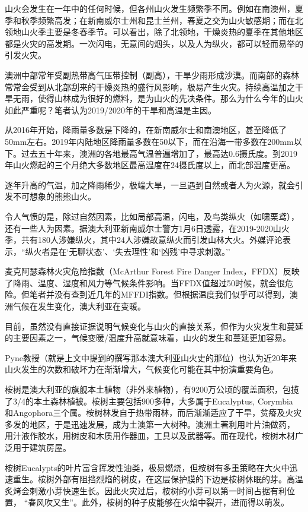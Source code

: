 \documentclass[
]{book}
\begin{document}
山火会发生在一年中的任何时候，但各州山火发生频繁季不同。例如在南澳州，夏季和秋季频繁高发；在新南威尔士州和昆士兰州，春夏之交为山火敏感期；而在北领地山火季主要是冬春季节。可以看出，除了北领地，干燥炎热的夏季在其他地区都是火灾的高发期。一次闪电，无意间的烟头，以及人为纵火，都可以轻而易举的引发火灾。

澳洲中部常年受副热带高气压带控制（副高），干旱少雨形成沙漠。而南部的森林常常会受到从北部刮来的干燥炎热的盛行风影响，极易产生火灾。持续高温加之干旱无雨，使得山林成为很好的燃料，是为山火的先决条件。那么为什么今年的山火如此严重呢？笔者认为2019/2020年的干旱和高温是主因。

从2016年开始，降雨量多数是下降的，在新南威尔士和南澳地区，甚至降低了50mm左右。2019年内陆地区降雨量多数在50以下，而在沿海一带多数在200mm以下。过去五十年来，澳洲的各地最高气温普遍增加了，最高达0.6摄氏度。到2019年山火燃起的三个月绝大多数地区最高温度在24摄氏度以上，而北部温度更高。

逐年升高的气温，加之降雨稀少，极端大旱，一旦遇到自然或者人为火源，就会引发不可想象的熊熊山火。

令人气愤的是，除过自然因素，比如局部高温，闪电，及鸟类纵火（如啸栗鸢），还有一些人为因素。据澳大利亚新南威尔士警方1月6日透露，在2019-2020山火季，共有180人涉嫌纵火，其中24人涉嫌故意纵火而引发山林大火。外媒评论表示，``纵火者是在`无聊状态'、`失去理性'和`凶残'中寻求刺激。''

麦克阿瑟森林火灾危险指数（McArthur Forest Fire Danger Index，FFDX）反映了降雨、温度、湿度和风力等气候条件影响。当FFDX值超过50时候，就会很危险。但笔者并没有查到近几年的MFFDI指数。但根据温度我们似乎可以得到，澳洲气候在发生变化，澳大利亚在变暖。

目前，虽然没有直接证据说明气候变化与山火的直接关系，但作为火灾发生和蔓延的主要因素之一，气候变暖/温度升高就意味着，山火的发生和蔓延更加容易。

Pyne教授（就是上文中提到的撰写那本澳大利亚山火史的那位）也认为近20年来山火发生的次数和破坏力在渐渐增大，气候变化可能在其中扮演重要角色。

桉树是澳大利亚的旗舰本土植物（非外来植物），有9200万公顷的覆盖面积，包揽了3/4的本土森林植被。桉树主要包括900多种，大多属于Eucalyptus, Corymbia 和Angophora三个属。桉树林发自于热带雨林，而后渐渐适应了干旱，贫瘠及火灾多发的地区，于是迅速发展，成为土澳第一大树种。澳洲土著利用叶片油做药， 用汁液作胶水，用树皮和木质用作器皿，工具以及武器等。而在现代，桉树木材广泛用于建筑房屋。

桉树Eucalypts的叶片富含挥发性油类，极易燃烧，但桉树有多重策略在大火中迅速重生。桉树外部有阻挡烈焰的树皮，在这层保护膜的下边是桉树休眠的芽。高温炙烤会刺激小芽快速生长。因此火灾过后，桉树的小芽可以第一时间占据有利位置， ``春风吹又生''。此外，桉树的种子皮能够在火焰中裂开，进而得以萌发。
\end{document}
